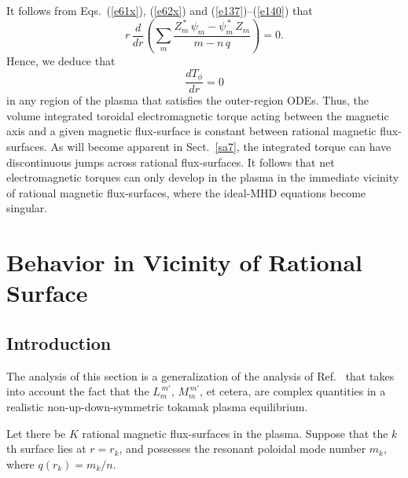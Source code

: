 \documentclass[12pt,prb,aps]{revtex4-1}
\begin{document}
 It follows from Eqs.~(\ref{e61x}), (\ref{e62x}) and (\ref{e137})--(\ref{e140}) that
\begin{equation}\label{e141c}
r\,\frac{d}{dr}\!\left(\sum_{m} \frac{Z_m^{\,\ast}\,\psi_m-\psi_m^{\,\ast}\,Z_m}{m-n\,q}\right)= 0.
\end{equation}
Hence, we deduce that\,\cite{am1}
\begin{equation}\label{etcons}
\frac{dT_\phi}{dr}=0
\end{equation}
in any region of the plasma that satisfies the outer-region ODEs. Thus, the volume integrated toroidal electromagnetic torque acting between the
magnetic axis and a given magnetic flux-surface is
constant between rational magnetic flux-surfaces. As will become apparent in Sect.~\ref{sa7}, the integrated torque can have discontinuous jumps across rational flux-surfaces. It follows that
net electromagnetic torques can only develop in the plasma in the immediate vicinity of rational magnetic flux-surfaces, where the ideal-MHD equations  become singular. \cite{rfa}

\section{Behavior in Vicinity of Rational Surface}\label{snus}
\subsection{Introduction}
The analysis of this section is a generalization of the analysis of Ref.~ that takes into
account the fact that the $L_m^{\,m'}$, $M_m^{\,m'}$, et cetera, are complex quantities in a realistic non-up-down-symmetric tokamak
plasma equilibrium.

Let there be $K$ rational magnetic flux-surfaces in the plasma. Suppose that the $k$th surface lies at $r=r_k$, and possesses the resonant
poloidal mode number $m_k$, where $q(r_k)=m_k/n$.   
\end{document}
